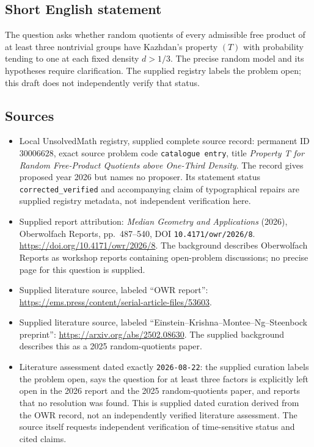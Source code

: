 \documentclass[11pt]{article}
\begin{document}
\subsection{Short English statement}
The question asks whether random quotients of every admissible free product of at least three nontrivial groups have Kazhdan's property \((T)\) with probability tending to one at each fixed density \(d>1/3\). The precise random model and its hypotheses require clarification. The supplied registry labels the problem open; this draft does not independently verify that status.
\subsection{Sources}
\begin{itemize}
\item Local UnsolvedMath registry, supplied complete source record: permanent ID \(30006628\), exact source problem code \texttt{catalogue entry}, title \emph{Property T for Random Free-Product Quotients above One-Third Density}. The record gives proposed year 2026 but names no proposer. Its statement status \texttt{corrected\_verified} and accompanying claim of typographical repairs are supplied registry metadata, not independent verification here.
\item Supplied report attribution: \emph{Median Geometry and Applications} (2026), Oberwolfach Reports, pp.~487--540, DOI \texttt{10.4171/owr/2026/8}. \url{https://doi.org/10.4171/owr/2026/8}. The background describes Oberwolfach Reports as workshop reports containing open-problem discussions; no precise page for this question is supplied.
\item Supplied literature source, labeled ``OWR report'': \url{https://ems.press/content/serial-article-files/53603}.
\item Supplied literature source, labeled ``Einstein--Krishna--Montee--Ng--Steenbock preprint'': \url{https://arxiv.org/abs/2502.08630}. The supplied background describes this as a 2025 random-quotients paper.
\item Literature assessment dated exactly \texttt{2026-08-22}: the supplied curation labels the problem open, says the question for at least three factors is explicitly left open in the 2026 report and the 2025 random-quotients paper, and reports that no resolution was found. This is supplied dated curation derived from the OWR record, not an independently verified literature assessment. The source itself requests independent verification of time-sensitive status and cited claims.
\end{itemize}
\end{document}
